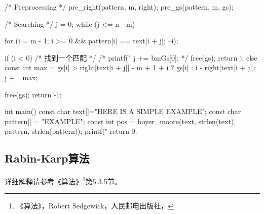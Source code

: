 \begin{Codex}[label=boyer_moore.c]
{    /* Preprocessing */
    pre_right(pattern, m, right);
    pre_gs(pattern, m, gs);

    /* Searching */
    j = 0;
    while (j <= n - m) {
        for (i = m - 1; i >= 0 && pattern[i] == text[i + j]; --i);

        if (i < 0) { /* 找到一个匹配 */
            /* printf("%
            j += bmGs[0]; */
            free(gs);
            return j;
        } else {
            const int max = gs[i] > right[text[i + j]] - m + 1 + i ?
                gs[i] : i - right[text[i + j]];
            j += max;
        }
    }
    free(gs);
    return -1;
}


int main() {
    const char text[]="HERE IS A SIMPLE EXAMPLE";
    const char pattern[] = "EXAMPLE";
    const int pos = boyer_moore(text, strlen(text), pattern, strlen(pattern));
    printf("%
    return 0;
}
\end{Codex}


\subsection{Rabin-Karp算法}
详细解释请参考《算法》\footnote{《算法》，Robert Sedgewick，人民邮电出版社，}第5.3.5节。

